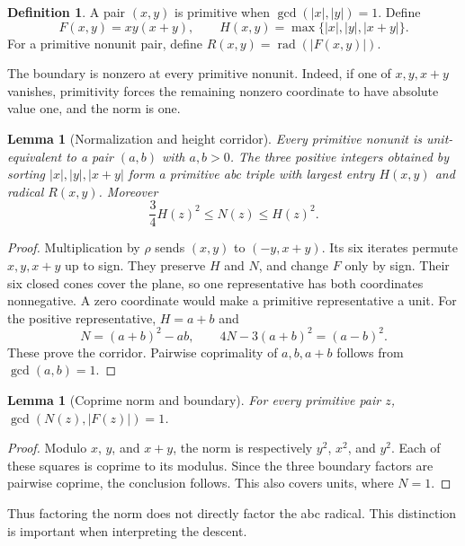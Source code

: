 \documentclass[11pt]{article}
\newtheorem{lemma}[theorem]{Lemma}
\theoremstyle{definition}
\newtheorem{definition}[theorem]{Definition}
\theoremstyle{remark}
\newcommand{\rad}{\operatorname{rad}}
\begin{document}
\begin{definition}
A pair $(x,y)$ is primitive when $\gcd(|x|,|y|)=1$. Define
\[
F(x,y)=xy(x+y),\qquad H(x,y)=\max\{|x|,|y|,|x+y|\}.
\]
For a primitive nonunit pair, define $R(x,y)=\rad(|F(x,y)|)$.
\end{definition}
The boundary is nonzero at every primitive nonunit. Indeed, if one of $x,y,x+y$ vanishes, primitivity forces the remaining nonzero coordinate to have absolute value one, and the norm is one.

\begin{lemma}[Normalization and height corridor]\label{lem:height}
Every primitive nonunit is unit-equivalent to a pair $(a,b)$ with $a,b>0$. The three positive integers obtained by sorting $|x|,|y|,|x+y|$ form a primitive abc triple with largest entry $H(x,y)$ and radical $R(x,y)$. Moreover
\begin{equation}\label{eq:corridor}
\frac34H(z)^2\le N(z)\le H(z)^2.
\end{equation}
\end{lemma}
\begin{proof}
Multiplication by $\rho$ sends $(x,y)$ to $(-y,x+y)$. Its six iterates permute $x,y,x+y$ up to sign. They preserve $H$ and $N$, and change $F$ only by sign. Their six closed cones cover the plane, so one representative has both coordinates nonnegative. A zero coordinate would make a primitive representative a unit. For the positive representative, $H=a+b$ and
\[
N=(a+b)^2-ab,\qquad 4N-3(a+b)^2=(a-b)^2.
\]
These prove the corridor. Pairwise coprimality of $a,b,a+b$ follows from $\gcd(a,b)=1$.
\end{proof}

\begin{lemma}[Coprime norm and boundary]\label{lem:disjoint}
For every primitive pair $z$, $\gcd(N(z),|F(z)|)=1$.
\end{lemma}
\begin{proof}
Modulo $x$, $y$, and $x+y$, the norm is respectively $y^2$, $x^2$, and $y^2$. Each of these squares is coprime to its modulus. Since the three boundary factors are pairwise coprime, the conclusion follows. This also covers units, where $N=1$.
\end{proof}
Thus factoring the norm does not directly factor the abc radical. This distinction is important when interpreting the descent.
\end{document}
